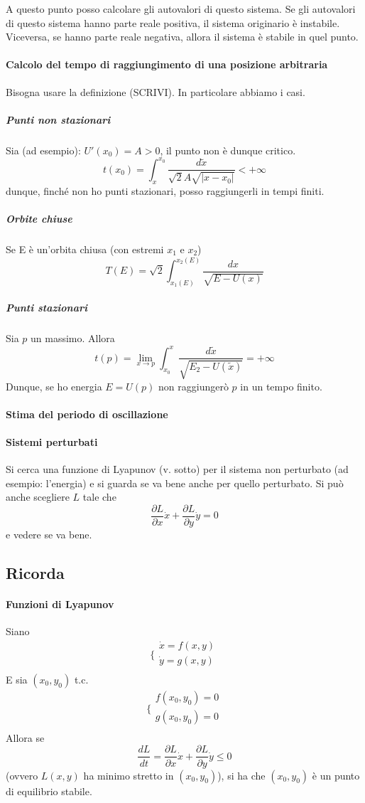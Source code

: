 \documentclass[a4paper,12pt]{article}
\begin{document}
A questo punto posso calcolare gli autovalori di questo sistema. Se gli autovalori di questo sistema hanno parte reale positiva, il sistema originario è instabile. Viceversa, se hanno parte reale negativa, allora il sistema è stabile in quel punto.

\paragraph{Calcolo del tempo di raggiungimento di una posizione arbitraria}
Bisogna usare la definizione (SCRIVI).
In particolare abbiamo i casi.
\subparagraph{Punti non stazionari}
Sia (ad esempio): $U'(x_0) = A > 0$, il punto non è dunque critico.
$$t(x_0) = \int_x^{x_0} \dfrac{d\tilde{x}}{\sqrt{2}A\sqrt{|x-x_0|}} < +\infty$$
dunque, finché non ho punti stazionari, posso raggiungerli in tempi finiti.
\subparagraph{Orbite chiuse}
Se E è un'orbita chiusa (con estremi $x_1$ e $x_2$)
$$ T(E) = \sqrt{2}\int_{x_1(E)}^{x_2(E)} \dfrac{dx}{\sqrt{E-U(x)}}$$
\subparagraph{Punti stazionari}
Sia $p$ un massimo.
Allora
$$t(p) = \lim_{x\to p} \int_{x_0}^x \dfrac{d\tilde{x}}{\sqrt{E_2 - U(\tilde{x})}} = +\infty$$
Dunque, se ho energia $E = U(p)$ non raggiungerò $p$ in un tempo finito.

\paragraph{Stima del periodo di oscillazione}


\paragraph{Sistemi perturbati}
Si cerca una funzione di Lyapunov (v. sotto) per il sistema non perturbato (ad esempio: l'energia) e si guarda se va bene anche per quello perturbato. Si può anche scegliere $L$ tale che $$\dfrac{\partial L}{\partial x}\dot{x} + \dfrac{\partial L}{\partial y}\dot{y} = 0 $$ e vedere se va bene.

\subsection{Ricorda}

\paragraph{Funzioni di Lyapunov}
Siano
$$\bigg\{ \begin{array}{l}
\dot{x} = f(x,y)\\
\dot{y} = g(x,y)\\
\end{array}$$
E sia $(x_0, y_0)$ t.c.
$$\bigg\{ \begin{array}{l}
f(x_0,y_0) = 0\\
g(x_0,y_0) = 0\\
\end{array}$$
Allora se
$$ \dfrac{dL}{dt} = \dfrac{\partial L}{\partial x}\dot{x} + \dfrac{\partial L}{\partial y}\dot{y} \leq 0 $$
(ovvero $L(x, y)$ ha minimo stretto in $(x_0, y_0)$), si ha che $(x_0,y_0)$ è un punto di equilibrio stabile.
\end{document}
